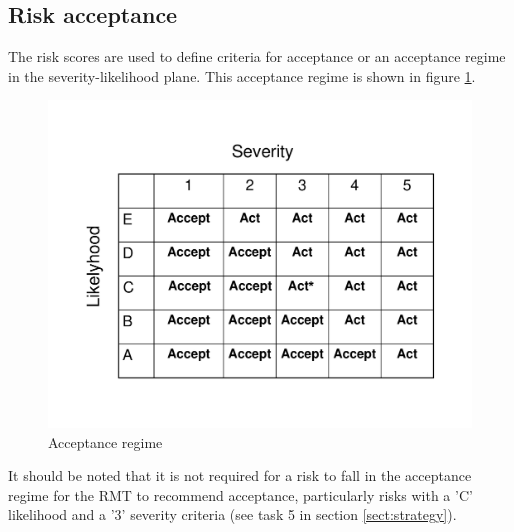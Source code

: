\subsection{Risk acceptance \label{sect:acceptance}}

The risk scores are used to define criteria for acceptance or an acceptance regime in the severity-likelihood plane. This acceptance regime is shown in figure \ref{fig:regime}.

  \begin{figure}[H]
  \begin{center}
  	\includegraphics[scale=0.5]{images/AcceptanceRegime}
  \end{center}
\vspace{-2cm}
\caption{Acceptance regime \label{fig:regime}}
   \end{figure}

It should be noted that it is not required for a risk to fall in the acceptance regime for the RMT to recommend acceptance, particularly risks with a 'C' likelihood and a '3' severity criteria (see task 5 in section \ref{sect:strategy}).

